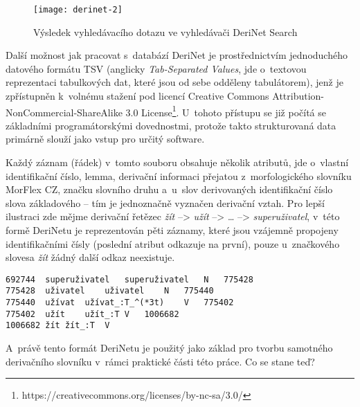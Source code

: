 \begin{figure}[ht]   
    \centering
    \texttt{[image: derinet-2]}  
    \caption{Výsledek vyhledávacího dotazu ve vyhledávači DeriNet Search~\parencite{derinet}}
    \label{derinet-2}
 \end{figure}

Další možnost jak pracovat s~databází DeriNet je prostřednictvím
jednoduchého datového formátu TSV (anglicky \emph{Tab-Separated Values},
jde o~textovou reprezentaci tabulkových dat, které jsou od sebe odděleny
tabulátorem), jenž je zpřístupněn k~volnému stažení pod licencí Creative
Commons Attribution-NonCommercial-ShareAlike 3.0
License\footnote{https://creativecommons.org/licenses/by-nc-sa/3.0/}.
U~tohoto přístupu se již počítá se základními programátorskými
dovednostmi, protože takto strukturovaná data primárně slouží jako vstup
pro určitý software.~\parencite{derinet-cz}

Každý záznam (řádek) v~tomto souboru obsahuje několik atributů, jde
o~vlastní identifikační číslo, lemma, derivační informaci přejatou
z~morfologického slovníku MorFlex CZ, značku slovního druhu a~u~slov
derivovaných identifikační číslo slova základového -- tím je jednoznačně
vyznačen derivační vztah. Pro lepší ilustraci zde mějme derivační
řetězec \emph{žít} --\textgreater{} \emph{užít} --\textgreater{}
\ldots{} --\textgreater{} \emph{superuživatel}, v~této formě DeriNetu je
reprezentován pěti záznamy, které jsou vzájemně propojeny
identifikačními čísly (poslední atribut odkazuje na první), pouze
u~značkového slovesa \emph{žít} žádný další odkaz neexistuje.
\parencite{derinet}

\begin{verbatim}
692744  superuživatel   superuživatel   N   775428
775428  uživatel    uživatel    N   775440
775440  užívat  užívat_:T_^(*3t)    V   775402
775402  užít    užít_:T V   1006682
1006682 žít žít_:T  V
\end{verbatim}

A~právě tento formát DeriNetu je použitý jako základ pro tvorbu
samotného derivačního slovníku v~rámci praktické části této práce. Co se
stane teď?
